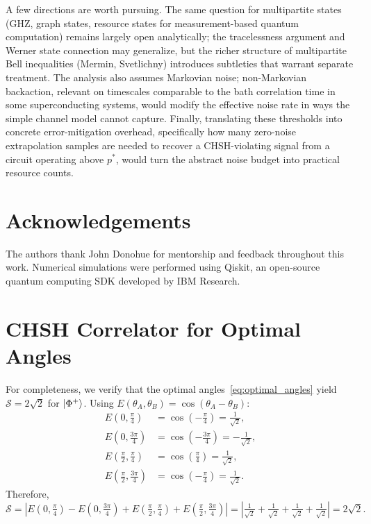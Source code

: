 \documentclass[12pt]{article}
\newcommand{\Phiplus}{\ket{\Phi^+}}
\newcommand{\pstar}{p^*}
\newcommand{\bigS}{\mathcal{S}}
\begin{document}
A few directions are worth pursuing.
The same question for multipartite states (GHZ, graph states, resource states for
measurement-based quantum computation) remains largely open analytically; the tracelessness
argument and Werner state connection may generalize, but the richer structure of multipartite
Bell inequalities (Mermin, Svetlichny) introduces subtleties that warrant separate treatment.
The analysis also assumes Markovian noise; non-Markovian backaction, relevant on timescales
comparable to the bath correlation time in some superconducting systems, would modify the
effective noise rate in ways the simple channel model cannot capture.
Finally, translating these thresholds into concrete error-mitigation overhead, specifically
how many zero-noise extrapolation samples are needed to recover a CHSH-violating signal from
a circuit operating above $\pstar$, would turn the abstract noise budget into practical resource counts.

\section*{Acknowledgements}

The authors thank John Donohue for mentorship and feedback throughout this work.
Numerical simulations were performed using Qiskit, an open-source quantum computing SDK developed
by IBM Research.




\appendix

\section{CHSH Correlator for Optimal Angles}
\label{app:correlator}

For completeness, we verify that the optimal angles~\eqref{eq:optimal_angles} yield $\bigS = 2\sqrt{2}$
for $\Phiplus$.
Using $E(\theta_A, \theta_B) = \cos(\theta_A - \theta_B)$:
\begin{align}
  E(0, \tfrac{\pi}{4})    &= \cos(-\tfrac{\pi}{4}) = \tfrac{1}{\sqrt{2}}, \label{eq:e1}\\
  E(0, \tfrac{3\pi}{4})   &= \cos(-\tfrac{3\pi}{4}) = -\tfrac{1}{\sqrt{2}}, \label{eq:e2}\\
  E(\tfrac{\pi}{2}, \tfrac{\pi}{4})  &= \cos(\tfrac{\pi}{4}) = \tfrac{1}{\sqrt{2}}, \label{eq:e3}\\
  E(\tfrac{\pi}{2}, \tfrac{3\pi}{4}) &= \cos(-\tfrac{\pi}{4}) = \tfrac{1}{\sqrt{2}}. \label{eq:e4}
\end{align}
Therefore,
\begin{equation}
  \bigS = \left|E(0,\tfrac{\pi}{4}) - E(0,\tfrac{3\pi}{4}) + E(\tfrac{\pi}{2},\tfrac{\pi}{4}) + E(\tfrac{\pi}{2},\tfrac{3\pi}{4})\right|
        = \left|\tfrac{1}{\sqrt{2}} + \tfrac{1}{\sqrt{2}} + \tfrac{1}{\sqrt{2}} + \tfrac{1}{\sqrt{2}}\right|
        = 2\sqrt{2}. \label{eq:smax_verify}
\end{equation}
\end{document}
